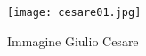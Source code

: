 \documentclass[a4paper, 12pt]{article} %
\begin{document}
\begin{figure} %
    \centering %
    \texttt{[image: cesare01.jpg]} %
    \caption{Immagine Giulio Cesare} %
    \label{fig:enter-label} %
\end{figure}
\end{document}
